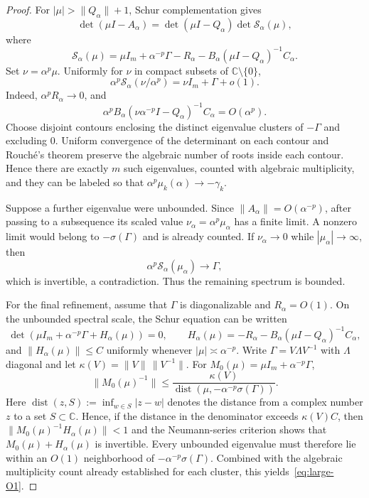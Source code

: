 \documentclass[preprint,12pt]{elsarticle}
\begin{document}
\begin{proof}
For $|\mu|>\|Q_\alpha\|+1$, Schur complementation gives
\[
 \det(\mu I-A_\alpha)
 =
 \det(\mu I-Q_\alpha)\det \mathcal S_\alpha(\mu),
\]
where
\[
 \mathcal S_\alpha(\mu)
 =
 \mu I_m+\alpha^{-p}\Gamma-R_\alpha
 -
 B_\alpha(\mu I-Q_\alpha)^{-1}C_\alpha.
\]
Set $\nu=\alpha^p\mu$.  Uniformly for $\nu$ in compact subsets of
$\mathbb C\setminus\{0\}$,
\[
 \alpha^p\mathcal S_\alpha(\nu/\alpha^p)
 =
 \nu I_m+\Gamma+o(1).
\]
Indeed, $\alpha^pR_\alpha\to0$, and
\[
 \alpha^p
 B_\alpha(\nu\alpha^{-p}I-Q_\alpha)^{-1}C_\alpha
 =
 O(\alpha^p).
\]
Choose disjoint contours enclosing the distinct eigenvalue clusters of
$-\Gamma$ and excluding $0$.  Uniform convergence of the determinant on each
contour and Rouch\'e's theorem preserve the algebraic number of roots inside
each contour.  Hence there are exactly $m$ such eigenvalues, counted with algebraic
multiplicity, and they can be labeled so that
$\alpha^p\mu_k(\alpha)\to-\gamma_k$.

Suppose a further eigenvalue were unbounded.  Since
$\|A_\alpha\|=O(\alpha^{-p})$, after passing to a subsequence its scaled value
$\nu_\alpha=\alpha^p\mu_\alpha$ has a finite limit.  A nonzero limit would
belong to $-\sigma(\Gamma)$ and is already counted.  If
$\nu_\alpha\to0$ while $|\mu_\alpha|\to\infty$, then
\[
    \alpha^p\mathcal S_\alpha(\mu_\alpha)\longrightarrow\Gamma,
\]
which is invertible, a contradiction.  Thus the remaining spectrum is bounded.

For the final refinement, assume that $\Gamma$ is diagonalizable and
$R_\alpha=O(1)$.  On the unbounded spectral scale, the Schur equation can be
written
\[
 \det\!\left(\mu I_m+\alpha^{-p}\Gamma+H_\alpha(\mu)\right)=0,
 \qquad
 H_\alpha(\mu)
 =-R_\alpha-B_\alpha(\mu I-Q_\alpha)^{-1}C_\alpha,
\]
and $\|H_\alpha(\mu)\|\le C$ uniformly whenever
$|\mu|\asymp\alpha^{-p}$.  Write $\Gamma=V\Lambda V^{-1}$ with $\Lambda$ diagonal and let
$\kappa(V)=\|V\|\,\|V^{-1}\|$.  For
$M_0(\mu)=\mu I_m+\alpha^{-p}\Gamma$,
\[
    \|M_0(\mu)^{-1}\|
    \le
    \frac{\kappa(V)}
    {\operatorname{dist}(\mu,-\alpha^{-p}\sigma(\Gamma))}.
\]
Here $\operatorname{dist}(z,S):=\inf_{w\in S}|z-w|$ denotes the distance
from a complex number $z$ to a set $S\subset\mathbb C$.
Hence, if the distance in the denominator exceeds $\kappa(V)C$, then
$\|M_0(\mu)^{-1}H_\alpha(\mu)\|<1$ and the Neumann-series criterion
shows that
$M_0(\mu)+H_\alpha(\mu)$ is invertible.  Every unbounded eigenvalue must
therefore lie within an $O(1)$ neighborhood of
$-\alpha^{-p}\sigma(\Gamma)$.  Combined with the algebraic multiplicity count
already established for each cluster, this yields~\eqref{eq:large-O1}.
\end{proof}
\end{document}
